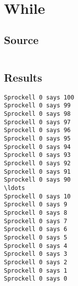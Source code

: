 \documentclass[twoside]{report}
\begin{document}
\section{While}
\subsection{Source}
\inputminted[tabsize=4,linenos,firstnumber=1]{text}{../../src/haskell/PP-project-2017/test/while.shl}
\subsection{Results}
\begin{verbatim}
Sprockell 0 says 100
Sprockell 0 says 99
Sprockell 0 says 98
Sprockell 0 says 97
Sprockell 0 says 96
Sprockell 0 says 95
Sprockell 0 says 94
Sprockell 0 says 93
Sprockell 0 says 92
Sprockell 0 says 91
Sprockell 0 says 90
\ldots
Sprockell 0 says 10
Sprockell 0 says 9
Sprockell 0 says 8
Sprockell 0 says 7
Sprockell 0 says 6
Sprockell 0 says 5
Sprockell 0 says 4
Sprockell 0 says 3
Sprockell 0 says 2
Sprockell 0 says 1
Sprockell 0 says 0
\end{verbatim}
\end{document}
